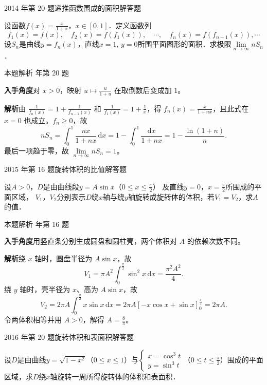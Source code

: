 \documentclass[UTF8,zihao=-4,fontset=fandol]{ctexart}
\renewcommand{\lim}{\operatorname*{lim}\limits}
\newcommand{\QuestionPage}[6]{%
  \par\noindent\begin{minipage}{\linewidth}
  \raggedright
  {\small\textcolor{black!60}{#3\quad #5}\hfill\textcolor{accent}{#2}}\par\smallskip}
\newcommand{\QuestionEnd}{\end{minipage}\par\medskip}
\newcommand{\QuestionPage}[6]{%
  \clearpage
  {\small\textcolor{accent}{#1\hfill #2}}\par\medskip
  {\small\textcolor{black!60}{#3\quad #5\hfill #6}}\par\vspace{9bp}}
\newcommand{\QuestionEnd}{}
\newenvironment{QuestionSolution}[1]{%
  \clearpage
  {\small\textcolor{black!60}{本题解析\quad #1}}\par\medskip
}{\par\clearpage}
\begin{document}
\QuestionPage{3.4 定积分的应用}{解答题}{2014 年第 20 题}{3}{递推函数围成的面积}{180 / 234}
设函数$f(x) = \frac{x}{1 + x}$，$x \in [0,1]$．定义函数列
\[
f_1(x) = f(x),\quad f_2(x) = f(f_1(x)),\quad \cdots,\quad f_n(x) = f(f_{n - 1}(x)), \cdots
\]
设$S_n$是曲线$y = f_n(x)$，直线$x = 1$, $y = 0$所围平面图形的面积．求极限$\lim_{n \to \infty} nS_n$．
\QuestionEnd

\begin{QuestionSolution}{2014 年第 20 题}
\textbf{入手角度}\quad 对 \(x>0\)，映射 \(u\mapsto \frac{u}{1+u}\) 在取倒数后变成加 \(1\)。

\textbf{解析}\quad 由 \(\frac{1}{f_n(x)}=1+\frac{1}{f_{n-1}(x)}\) 和 \(\frac{1}{f_1(x)}=1+\frac{1}{x}\)，得 \(f_n(x)=\frac{x}{1+nx}\)，且此式在 \(x=0\) 也成立。\(f_n\ge0\)，故
\[
nS_n=\int_0^1\frac{nx}{1+nx}\,\mathrm{d}x
=1-\int_0^1\frac{\mathrm{d}x}{1+nx}
=1-\frac{\ln(1+n)}{n}.
\]
最后一项趋于零，故 \(\lim_{n\to\infty}nS_n=\boxed{1}\)。
\end{QuestionSolution}

\QuestionPage{3.4 定积分的应用}{解答题}{2015 年第 16 题}{2}{旋转体积的比值}{181 / 234}
设$A > 0$，$D$是由曲线段$y = A\sin x$（$0 \le x \le \frac{\pi}{2}$）
及直线$y = 0$，$x = \frac{\pi}{2}$所围成的平面区域，
$V_1$，$V_2$分别表示$D$绕$x$轴与绕$y$轴旋转成旋转体的体积，若$V_1 = V_2$，求$A$的值．
\QuestionEnd

\begin{QuestionSolution}{2015 年第 16 题}
\textbf{入手角度}\quad 用竖直条分别生成圆盘和圆柱壳，两个体积对 \(A\) 的依赖次数不同。

\textbf{解析}\quad 绕 \(x\) 轴时，圆盘半径为 \(A\sin x\)，故
\[
V_1=\pi A^2\int_0^{\frac{\pi}{2}}\sin^2x\,\mathrm{d}x=\frac{\pi^2 A^2}{4}.
\]
绕 \(y\) 轴时，壳半径为 \(x\)、高为 \(A\sin x\)，故
\[
V_2=2\pi A\int_0^{\frac{\pi}{2}}x\sin x\,\mathrm{d}x
=2\pi A[-x\cos x+\sin x]_0^{\frac{\pi}{2}}=2\pi A.
\]
令两体积相等并用 \(A>0\)，解得 \(A=\boxed{\frac{8}{\pi}}\)。
\end{QuestionSolution}

\QuestionPage{3.4 定积分的应用}{解答题}{2016 年第 20 题}{3}{旋转体积和表面积}{182 / 234}
设$D$是由曲线$y = \sqrt{1 - x^2}$（$0 \le x \le 1$）与$\begin{cases}
  x = \cos^3 t \\
  y = \sin^3 t
\end{cases}$（$0 \le t \le \frac{\pi}{2}$）围成的平面区域，求$D$绕$x$轴旋转一周所得旋转体的体积和表面积．
\QuestionEnd
\end{document}
